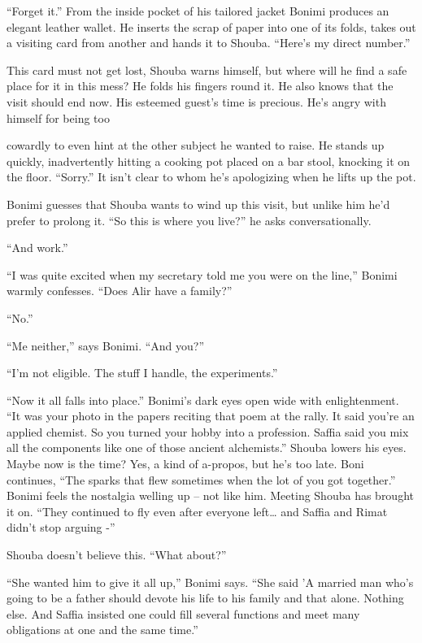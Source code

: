 \documentclass[twoside,11pt]{book}
\begin{document}
``Forget it.'' From the inside pocket of his tailored jacket Bonimi produces an elegant
leather wallet. He inserts the scrap of paper into one of its folds, takes out a visiting card from another and hands
it to Shouba. ``Here's my direct number.''

This card must not get lost, Shouba warns himself, but where will he find a safe place for it in this mess? He folds his
fingers round it. He also knows that the visit should end now. His esteemed guest's time is precious.
He's angry with himself for being too

cowardly to even hint at the other subject he wanted to raise. He stands up quickly, inadvertently hitting a cooking
pot placed on a bar stool, knocking it on the floor. ``Sorry.'' It isn't clear to whom he's
apologizing when he lifts up the pot.

Bonimi guesses that Shouba wants to wind up this visit, but unlike him he'd prefer to prolong it. ``So this
is where you live?'' he asks conversationally.

``And work.''

``I was quite excited when my secretary told me you were on the line,'' Bonimi warmly
confesses. ``Does Alir have a family?''

``No.''

``Me neither,'' says Bonimi. ``And you?''

``I'm not eligible. The stuff I handle, the experiments.''

``Now it all falls into place.'' Bonimi's dark eyes open wide with enlightenment.
``It was your photo in the papers reciting that poem at the rally. It said you're an applied chemist. So
you turned your hobby into a profession. Saffia said you mix all the components like one of those ancient
alchemists.'' Shouba lowers his eyes. Maybe now is the time? Yes, a kind of a-propos, but he's too late.
Boni continues, ``The sparks that flew sometimes when the lot of you got together.''
Bonimi feels the nostalgia welling up -- not like him. Meeting Shouba has brought it on. ``They continued
to fly even after everyone left{\dots} and Saffia and Rimat didn't stop arguing -''

Shouba doesn't believe this. ``What about?''

``She wanted him to give it all up,'' Bonimi says. ``She said
'A married man who's going to be a father should devote his life to his family and that alone. Nothing else. And Saffia
insisted one could fill several functions and meet many obligations at one and the same time.''
\end{document}
